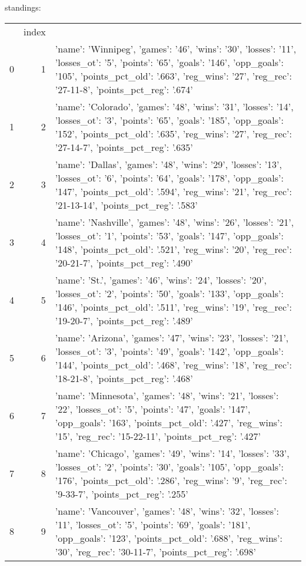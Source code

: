 {} standings:
\begin{tabular}{lrl}
 & index &  \\
0 & 1 & {'name': 'Winnipeg', 'games': '46', 'wins': '30', 'losses': '11', 'losses_ot': '5', 'points': '65', 'goals': '146', 'opp_goals': '105', 'points_pct_old': '.663', 'reg_wins': '27', 'reg_rec': '27-11-8', 'points_pct_reg': '.674'} \\
1 & 2 & {'name': 'Colorado', 'games': '48', 'wins': '31', 'losses': '14', 'losses_ot': '3', 'points': '65', 'goals': '185', 'opp_goals': '152', 'points_pct_old': '.635', 'reg_wins': '27', 'reg_rec': '27-14-7', 'points_pct_reg': '.635'} \\
2 & 3 & {'name': 'Dallas', 'games': '48', 'wins': '29', 'losses': '13', 'losses_ot': '6', 'points': '64', 'goals': '178', 'opp_goals': '147', 'points_pct_old': '.594', 'reg_wins': '21', 'reg_rec': '21-13-14', 'points_pct_reg': '.583'} \\
3 & 4 & {'name': 'Nashville', 'games': '48', 'wins': '26', 'losses': '21', 'losses_ot': '1', 'points': '53', 'goals': '147', 'opp_goals': '148', 'points_pct_old': '.521', 'reg_wins': '20', 'reg_rec': '20-21-7', 'points_pct_reg': '.490'} \\
4 & 5 & {'name': 'St.', 'games': '46', 'wins': '24', 'losses': '20', 'losses_ot': '2', 'points': '50', 'goals': '133', 'opp_goals': '146', 'points_pct_old': '.511', 'reg_wins': '19', 'reg_rec': '19-20-7', 'points_pct_reg': '.489'} \\
5 & 6 & {'name': 'Arizona', 'games': '47', 'wins': '23', 'losses': '21', 'losses_ot': '3', 'points': '49', 'goals': '142', 'opp_goals': '144', 'points_pct_old': '.468', 'reg_wins': '18', 'reg_rec': '18-21-8', 'points_pct_reg': '.468'} \\
6 & 7 & {'name': 'Minnesota', 'games': '48', 'wins': '21', 'losses': '22', 'losses_ot': '5', 'points': '47', 'goals': '147', 'opp_goals': '163', 'points_pct_old': '.427', 'reg_wins': '15', 'reg_rec': '15-22-11', 'points_pct_reg': '.427'} \\
7 & 8 & {'name': 'Chicago', 'games': '49', 'wins': '14', 'losses': '33', 'losses_ot': '2', 'points': '30', 'goals': '105', 'opp_goals': '176', 'points_pct_old': '.286', 'reg_wins': '9', 'reg_rec': '9-33-7', 'points_pct_reg': '.255'} \\
8 & 9 & {'name': 'Vancouver', 'games': '48', 'wins': '32', 'losses': '11', 'losses_ot': '5', 'points': '69', 'goals': '181', 'opp_goals': '123', 'points_pct_old': '.688', 'reg_wins': '30', 'reg_rec': '30-11-7', 'points_pct_reg': '.698'} \\

\end{tabular}
